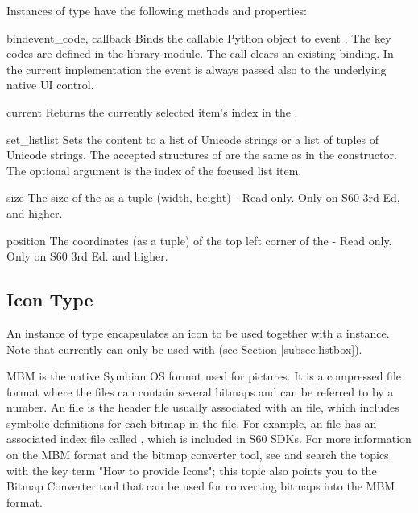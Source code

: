 Instances of  type have the following methods and properties:

\begin{methoddesc}[Listbox]{bind}{event_code, callback}
Binds the callable Python object  to event 
. The key codes are defined in 
the  library module. The call
 clears an 
existing binding. In the current implementation the event is always passed 
also to the underlying native UI control.
\end{methoddesc}

\begin{methoddesc}[Listbox]{current}{}
Returns the currently selected item's index in the .
\end{methoddesc}

\begin{methoddesc}[Listbox]{set_list}{list}
Sets the  content to a list of Unicode strings or a
list of tuples of Unicode strings. The accepted structures of  are the
same as in the  constructor. The optional argument  is the index of the focused list item.
\end{methoddesc}

\begin{memberdesc}[Listbox]{size}
The size of the  as a tuple (width, height) - Read only. Only on S60 3rd Ed, and higher.
\end{memberdesc}

\begin{memberdesc}[Listbox]{position}
The coordinates (as a tuple) of the top left corner of the  -
Read only. Only on S60 3rd Ed. and higher.
\end{memberdesc}

\subsection{Icon Type}
\label{subsec:icon}
An instance of  type encapsulates an icon to be used together 
with a  instance. Note that currently  can only 
be used with  (see Section \ref{subsec:listbox}).

MBM is the native Symbian OS format used for pictures. It is a
compressed file format where the files can contain several bitmaps and
can be referred to by a number. An  file is the header file
usually associated with an  file, which includes symbolic
definitions for each bitmap in the file. For example, an
 file has an associated index file called
, which is included in S60 SDKs. For more information
on the MBM format and the bitmap converter tool, see \cite{S60Doc} and
search the topics with the key term "How to provide Icons"; this topic
also points you to the Bitmap Converter tool that can be used for
converting bitmaps into the MBM format.

